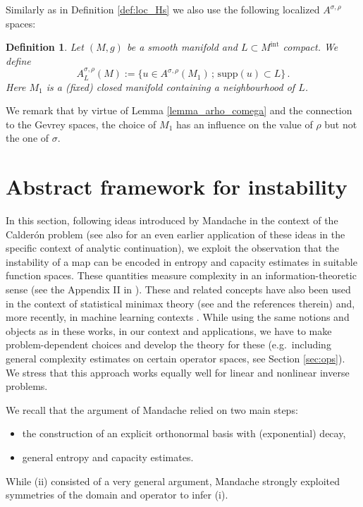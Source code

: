 \documentclass[12pt,twoside]{amsart}
\numberwithin{equation}{section}
\newtheorem{definition}[theorem]{Definition}
\newcommand{\supp}{\mathrm{supp}}
\begin{document}
Similarly as in Definition \ref{def:loc_Hs} we also use the following localized $A^{\sigma,\rho}$ spaces:

\begin{definition}
\label{defi:Gev_loc}
Let $(M,g)$ be a smooth manifold and $L\subset M^{\text{int}}$ compact. We define $$A^{\sigma, \rho}_L(M):=\{u\in A^{\sigma,\rho}(M_1) \,;\, \supp(u)\subset L\}\,.$$ Here $M_1$ is a (fixed) closed manifold containing a neighbourhood of $L$. 
\end{definition}

We remark that by virtue of Lemma \ref{lemma_arho_comega} and the connection to the Gevrey spaces, the choice of $M_1$ has an influence on the value of $\rho$ but not the one of $\sigma$.






\section{Abstract framework for instability}
\label{sec:abstract}


In this section, following ideas introduced by Mandache \cite{Mandache} in the context of the Calder\'on problem (see also \cite{SV93} for an even earlier application of these ideas in the specific context of analytic continuation), we exploit the observation that the instability of a map can be encoded in entropy and capacity estimates in suitable function spaces. These quantities measure complexity in an information-theoretic sense (see the Appendix II in \cite{KolmogorovTikhomirov}). These and related concepts have also been used in the context of statistical minimax theory (see \cite[Chapter 6.3 and Theorem 6.3.2]{GN21} and the references therein) and, more recently, in machine learning contexts \cite{BGKP19}. While using the same notions and objects as in these works, in our context and applications, we have to make problem-dependent choices and develop the theory for these (e.g.~including general complexity estimates on certain operator spaces, see Section \ref{sec:ops}).
We stress that this approach works equally well for linear and nonlinear inverse problems.

We recall that the argument of Mandache relied on two main steps:
\begin{itemize}
\item[(i)] the construction of an explicit orthonormal basis with (exponential) decay,
\item[(ii)] general entropy and capacity estimates.
\end{itemize}
While (ii) consisted of a very general argument, Mandache strongly exploited symmetries of the domain and operator to infer (i).
\end{document}
